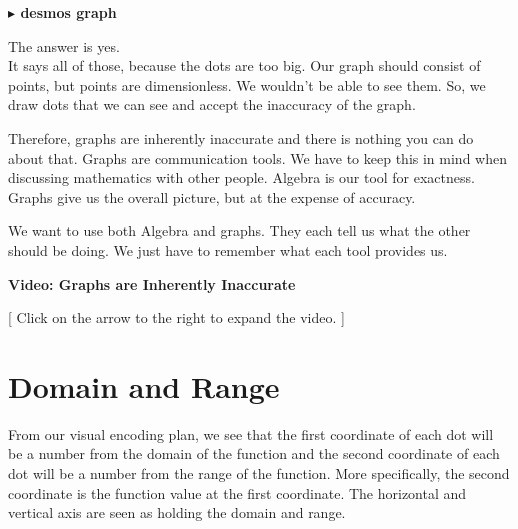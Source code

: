 \documentclass{ximera}
\begin{document}
\begin{onlineOnly}
\textbf{\textcolor{blue!55!black}{$\blacktriangleright$ desmos graph}} 
\begin{center}
\end{center}
\end{onlineOnly}



The answer is yes.  \\


It says all of those, because the dots are too big.  Our graph should consist of points, but points are dimensionless.  We wouldn't be able to see them.  So, we draw dots that we can see and accept the inaccuracy of the graph.

Therefore, graphs are inherently inaccurate and there is nothing you can do about that.  Graphs are communication tools. We have to keep this in mind when discussing mathematics with other people. Algebra is our tool for exactness.  Graphs give us the overall picture, but at the expense of accuracy.

We want to use both Algebra and graphs.  They each tell us what the other should be doing.  We just have to remember what each tool provides us.






\begin{explanation} \textbf{Video: Graphs are Inherently Inaccurate}

[ Click on the arrow to the right to expand the video. ]
\begin{expandable} 

\begin{center}
\end{center}

\end{expandable}
\end{explanation}














\section*{Domain and Range}


From our visual encoding plan, we see that the first coordinate of each dot will be a number from the domain of the function and the second coordinate of each dot will be a number from the range of the function.  More specifically, the second coordinate is the function value at the first coordinate.  The horizontal and vertical axis are seen as holding the domain and range.
\end{document}

